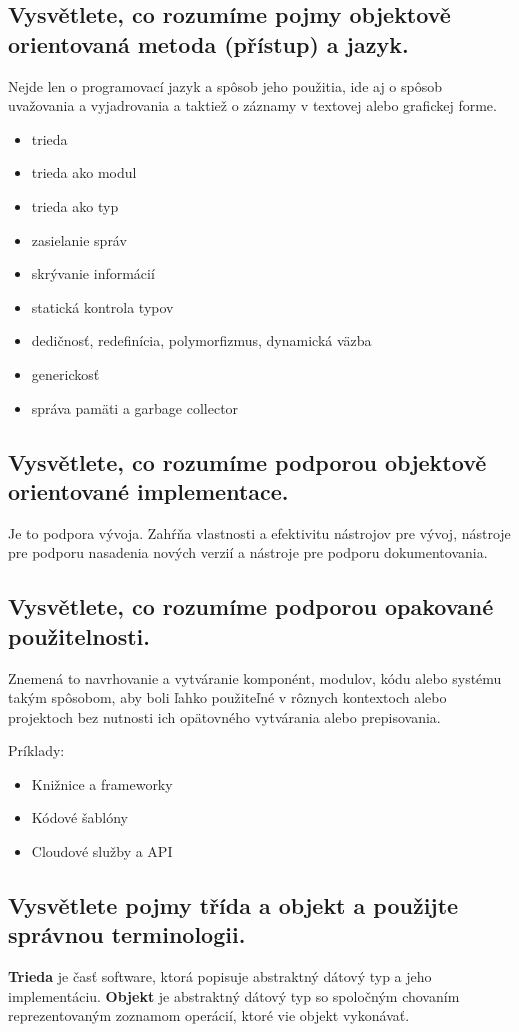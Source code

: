 \subsection{Vysvětlete, co rozumíme pojmy objektově orientovaná metoda (přístup) a jazyk.}
Nejde len o programovací jazyk a spôsob jeho použitia, ide aj o spôsob uvažovania a vyjadrovania a taktiež o záznamy v textovej alebo grafickej forme.

\begin{itemize}
    \item trieda
    \item trieda ako modul
    \item trieda ako typ
    \item zasielanie správ
    \item skrývanie informácií
    \item statická kontrola typov
    \item dedičnosť, redefinícia, polymorfizmus, dynamická väzba
    \item generickosť
    \item správa pamäti a garbage collector
\end{itemize}

\subsection{Vysvětlete, co rozumíme podporou objektově orientované implementace.}
Je to podpora vývoja. Zahŕňa vlastnosti a efektivitu nástrojov pre vývoj, nástroje pre podporu nasadenia nových verzií a nástroje pre podporu dokumentovania.


\subsection{Vysvětlete, co rozumíme podporou opakované použitelnosti.}
Znemená to navrhovanie a vytváranie komponént, modulov, kódu alebo systému takým spôsobom, aby boli ľahko použiteľné v rôznych kontextoch alebo projektoch bez nutnosti ich opätovného vytvárania alebo prepisovania.

Príklady:
\begin{itemize}
    \item Knižnice a frameworky
    \item Kódové šablóny
    \item Cloudové služby a API
\end{itemize}


\subsection{Vysvětlete pojmy třída a objekt a použijte správnou terminologii.}
\textbf{Trieda} je časť software, ktorá popisuje abstraktný dátový typ a jeho implementáciu. \newline
\textbf{Objekt} je abstraktný dátový typ so spoločným chovaním reprezentovaným zoznamom operácií, ktoré vie objekt vykonávať.



